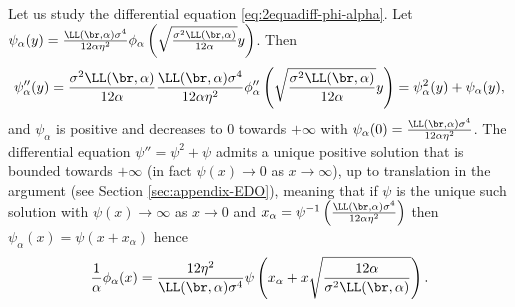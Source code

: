 \documentclass[10pt,a4paper]{article}
\begin{document}
Let us study the differential equation \eqref{eq:2equadiff-phi-alpha}. 
Let $\psi_\alpha(y) = \frac{\LL(\br,\alpha) \sigma^4}{12 \alpha \eta^2} \phi_\alpha\left( \sqrt{\frac{\sigma^2\LL(\br,\alpha)}{12\alpha}} y \right) $. Then 
\[ \psi_\alpha''(y) = \frac{\sigma^2 \LL(\br,\alpha)}{12 \alpha} \frac{\LL(\br,\alpha) \sigma^4}{12 \alpha \eta^2} \phi''_\alpha\left(\sqrt{\frac{\sigma^2\LL(\br,\alpha)}{12\alpha}} y \right) = \psi_\alpha^2(y) + \psi_\alpha(y) , \]
and $\psi_\alpha$ is positive and decreases to $0$ towards $+\infty$ with $\psi_\alpha(0) = \frac{\LL(\br,\alpha) \sigma^4}{12 \alpha \eta^2}$. 
The differential equation $\psi'' = \psi^2 + \psi$ admits a unique positive solution that is bounded towards $+\infty$ (in fact $\psi(x)\to 0$ as $x\to\infty$), up to translation in the argument (see Section \ref{sec:appendix-EDO}), meaning that if $\psi$ is the unique such solution with $\psi(x)\to\infty$ as $x\to 0$ and $x_\alpha = \psi^{-1}\left( \frac{\LL(\br,\alpha) \sigma^4}{12 \alpha \eta^2} \right)$ then $\psi_\alpha(x) = \psi(x + x_\alpha)$ hence
\begin{equation}\label{eq:2phi-psi-vol}
\frac{1}{\alpha} \phi_\alpha(x) = \frac{12 \eta^2}{\LL(\br,\alpha) \sigma^4} \psi\left( x_\alpha + x \sqrt{\frac{12\alpha}{\sigma^2\LL(\br,\alpha)}} \right) . 
\end{equation}
\end{document}
